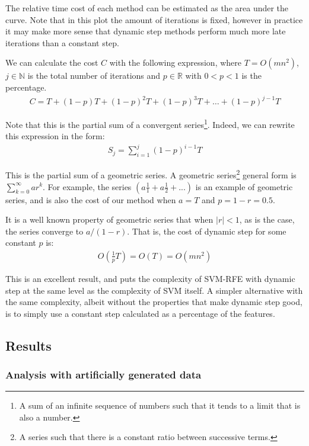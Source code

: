 The relative time cost of each method can be estimated as the area under the curve. Note that in this plot the amount of iterations is fixed, however in practice it may make more sense that dynamic step methods perform much more late iterations than a constant step.

We can calculate the cost $C$ with the following expression, where $T = O(mn^2)$, $j \in \mathbb{N}$ is the total number of iterations and $p \in \mathbb{R}$ with $0 < p < 1$ is the percentage.
\begin{align*}
   C = T + (1 - p)T + (1 - p)^2T + (1 - p)^3T + \dots + (1 - p)^{j - 1} T
\end{align*}

Note that this is the partial sum of a convergent series\footnote{A sum of an infinite sequence of numbers such that it tends to a limit that is also a number.}. Indeed, we can rewrite this expression in the form:
\begin{align*}
    S_j = \sum_{i = 1}^{j} (1 - p)^{i - 1} T
\end{align*}

This is the partial sum of a geometric series. A geometric series\footnote{A series such that there is a constant ratio between successive terms.} general form is $\sum_{k=0}^{\infty} ar^k$. For example, the series $(a\frac{1}{1} + a\frac{1}{2} + ...)$ is an example of geometric series, and is also the cost of our method when $a = T$ and $p = 1 - r = 0.5$.

It is a well known property of geometric series that when $|r| < 1$, as is the case, the series converge to $a / (1 - r)$. That is, the cost of dynamic step for some constant $p$ is:
\begin{align*}
    O(\frac{1}{p} T) = O(T) = O(mn^2)
\end{align*}

This is an excellent result, and puts the complexity of SVM-RFE with dynamic step at the same level as the complexity of SVM itself. A simpler alternative with the same complexity, albeit without the properties that make dynamic step good, is to simply use a constant step calculated as a percentage of the features.
 
\subsection{Results}

\subsubsection*{Analysis with artificially generated data}
\label{sec:ch5.dstep.gen}


